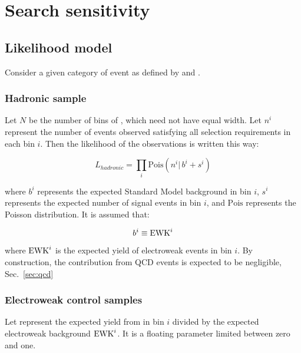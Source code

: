 \section{Search sensitivity}
\label{sec:sensitivity}
\subsection{Likelihood model}

Consider a given category of event as defined by \njet and \nb.

\subsubsection{Hadronic sample}
\label{sec:hadronicLikelihood}
Let $N$ be the number of bins of \HT, which need not have equal width.
Let $n^i$ represent the number of events observed satisfying all
selection requirements in each \HT bin $i$.  Then the likelihood of
the observations is written this way:

\begin{equation}
L_{hadronic}=\prod_i \mathrm{Pois}(n^i |\, b^i + s^i)
\label{eq:hadronicLikelihood}
\end{equation}

where $b^i$ represents the expected Standard Model background in bin
$i$, $s^i$ represents the expected number of signal events in bin $i$,
and $\mathrm{Pois}$ represents the Poisson distribution.  It is
assumed that:

\begin{equation}
  b^i\equiv \mathrm{EWK}^i
  \label{eq:ewkTotal}
\end{equation}

where $\mathrm{EWK}^i$ is the expected yield of electroweak events in bin $i$.
By construction, the contribution from QCD events is expected to be negligible, 
Sec.~\ref{sec:qcd}



\subsubsection{Electroweak control samples\label{sec:ewk}}

Let  represent the expected yield from \znunu in bin $i$
divided by the expected electroweak background $\mathrm{EWK}^{i}$.  It is
a floating parameter limited between zero and one.

